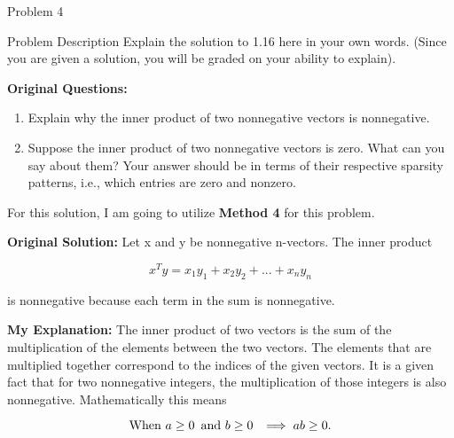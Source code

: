 \begin{problem}{Problem 4}
    \begin{statement}{Problem Description}
        Explain the solution to 1.16 here in your own words. (Since you are given a solution, you will be graded on your ability to explain). \vspace*{1em}

        \textbf{Original Questions:}
        
        \begin{enumerate}[label=(\alph*)]
            \item Explain why the inner product of two nonnegative vectors is nonnegative.
            \item Suppose the inner product of two nonnegative vectors is zero. What can you say about them? Your answer should be in terms of their respective sparsity patterns,
            i.e., which entries are zero and nonzero.
        \end{enumerate}
    \end{statement}

    \begin{Highlight}
        For this solution, I am going to utilize \textbf{Method 4} for this problem. \vspace*{1em}

        \textbf{Original Solution:} Let x and y be nonnegative n-vectors. The inner product

        \setcounter{equation}{0}
        \begin{equation}
            x^{T}y = x_{1}y_{1} + x_{2}y_{2} + ... + x_{n}y_{n}
        \end{equation}

        is nonnegative because each term in the sum is nonnegative. \vspace*{1em}

        \textbf{My Explanation:} The inner product of two vectors is the sum of the multiplication of the elements between the two vectors. The elements that are multiplied together correspond to the 
        indices of the given vectors. It is a given fact that for two nonnegative integers, the multiplication of those integers is also nonnegative. Mathematically this means

        \begin{equation}
            \text{When } a \geq 0 \hspace*{5pt} \text{and } b \geq 0 \hspace*{5pt} \implies ab \geq 0.
        \end{equation}


\end{Highlight}
\end{problem}

